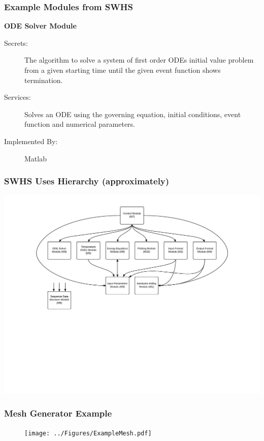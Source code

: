 \documentclass[t, 12pt, numbers, fleqn, handout]{beamer}
\begin{document}
\begin{frame}
\frametitle{Example Modules from SWHS}

\textbf{ODE Solver Module}

\begin{description}
\item[Secrets:] The algorithm to solve a system of first order ODEs initial
  value problem from a given starting time until the given event function shows
  termination.
\item[Services:] Solves an ODE using the governing equation, initial
  conditions, event function and numerical parameters.
\item[Implemented By:] Matlab
\end{description}

\end{frame}


\begin{frame}

\frametitle{SWHS Uses Hierarchy (approximately)}

\begin{center}
\includegraphics[scale=0.55]{../Figures/UsesHierarchy.pdf}
\end{center}

\end{frame}


\begin{frame}
\frametitle{Mesh Generator Example}
\vspace{-1cm}
\begin{figure}[H]
\texttt{[image: ../Figures/ExampleMesh.pdf]}
\end{figure}\end{frame}
\end{document}
